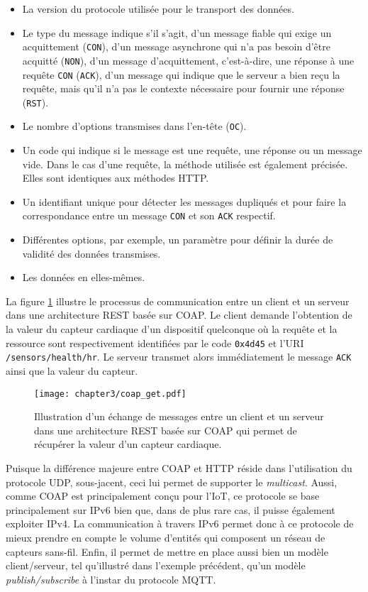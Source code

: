 \begin{itemize}[label=\textbullet]
    \item
        La version du protocole utilisée pour le transport des données.
    \item
        Le type du message indique s'il s'agit, d'un message fiable qui exige un acquittement (\texttt{CON}), d'un message asynchrone qui n’a pas besoin d’être acquitté (\texttt{NON}), d'un message d’acquittement, c'est-à-dire, une réponse à une requête \texttt{CON} (\texttt{ACK}), d'un message qui indique que le serveur a bien reçu la requête, mais qu'il n’a pas le contexte nécessaire pour fournir une réponse (\texttt{RST}).
    \item
        Le nombre d'options transmises dans l'en-tête (\texttt{OC}).
    \item
        Un code qui indique si le message est une requête, une réponse ou un message vide. Dans le cas d’une requête, la méthode utilisée est également précisée. Elles sont identiques aux méthodes \ac{HTTP}.
    \item
        Un identifiant unique pour détecter les messages dupliqués et pour faire la correspondance entre un message \texttt{CON} et son \texttt{ACK} respectif.
    \item
        Différentes options, par exemple, un paramètre pour définir la durée de validité des données transmises.
    \item
        Les données en elles-mêmes.
\end{itemize}

\noindent La figure \ref{fig:coap_get} illustre le processus de communication entre un client et un serveur dans une architecture \ac{REST} basée sur \ac{COAP}. Le client demande l'obtention de la valeur du capteur cardiaque d'un dispositif quelconque où la requête et la ressource sont respectivement identifiées par le code \texttt{0x4d45} et l'\ac{URI} \texttt{/sensors/health/hr}. Le serveur transmet alors immédiatement le message \texttt{ACK} ainsi que la valeur du capteur.

\begin{figure}[H]
	\centering
	\texttt{[image: chapter3/coap\_get.pdf]}
        \caption{Illustration d'un échange de messages entre un client et un serveur dans une architecture \ac{REST} basée sur \ac{COAP} qui permet de récupérer la valeur d'un capteur cardiaque.}
	\label{fig:coap_get}
\end{figure}

Puisque la différence majeure entre \ac{COAP} et \ac{HTTP} réside dans l'utilisation du protocole \ac{UDP}, sous-jacent, ceci lui permet de supporter le \textit{multicast}. Aussi, comme \ac{COAP} est principalement conçu pour l'\acs{IoT}, ce protocole se base principalement sur IPv6 bien que, dans de plus rare cas, il puisse également exploiter IPv4. La communication à travers IPv6 permet donc à ce protocole de mieux prendre en compte le volume d'entités qui composent un réseau de capteurs sans-fil. Enfin, il permet de mettre en place aussi bien un modèle client/serveur, tel qu'illustré dans l'exemple précédent, qu'un modèle \textit{publish/subscribe} à l'instar du protocole \ac{MQTT}.

